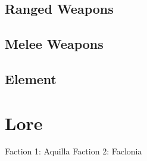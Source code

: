 \documentclass{report}
\begin{document}
    \section{Ranged Weapons}
    \section{Melee Weapons}
    \section{Element}
 




\chapter{Lore}

Faction 1: Aquilla
Faction 2: Faclonia
\end{document}
